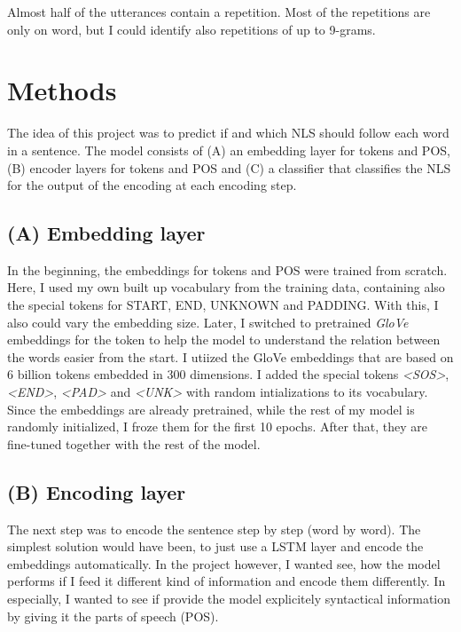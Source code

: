 \documentclass[
	11pt, %
]{fphw}
\begin{document}
Almost half of the utterances contain a repetition. Most of the repetitions are only on word, but I could identify also repetitions of up to 9-grams.

\section*{Methods}
The idea of this project was to predict if and which NLS should follow each word in a sentence. The model consists of (A) an embedding layer for tokens and POS, (B) encoder layers for tokens and POS and (C) a classifier that classifies the NLS for the output of the encoding at each encoding step.

\subsection*{(A) Embedding layer}
In the beginning, the embeddings for tokens and POS were trained from scratch. Here, I used my own built up vocabulary from the training data, containing also the special tokens for START, END, UNKNOWN and PADDING. With this, I also could vary the embedding size. Later, I switched to pretrained \emph{GloVe} embeddings for the token to help the model to understand the relation between the words easier from the start. I utiized the GloVe embeddings that are based on 6 billion tokens embedded in 300 dimensions. I added the special tokens \emph{<SOS>}, \emph{<END>}, \emph{<PAD>} and \emph{<UNK>} with random intializations to its vocabulary. Since the embeddings are already pretrained, while the rest of my model is randomly initialized, I froze them for the first 10 epochs. After that, they are fine-tuned together with the rest of the model.

\subsection*{(B) Encoding layer}
The next step was to encode the sentence step by step (word by word). The simplest solution would have been, to just use a LSTM layer and encode the embeddings automatically. In the project however, I wanted see, how the model performs if I feed it different kind of information and encode them differently. In especially, I wanted to see if provide the model explicitely syntactical information by giving it the parts of speech (POS).
\end{document}
